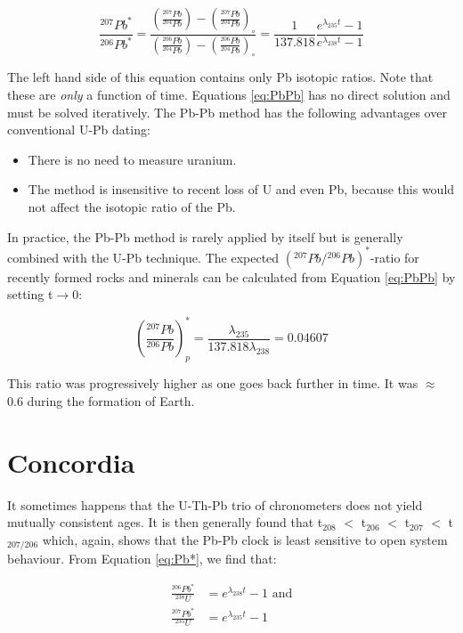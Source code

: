 \begin{equation}
\frac{^{207}Pb^*}{^{206}Pb^*} = 
\frac{\left(\frac{^{207}Pb}{^{204}Pb}\right)-\left(\frac{^{207}Pb}{^{204}Pb}\right)_\circ}
{\left(\frac{^{206}Pb}{^{204}Pb}\right)-\left(\frac{^{206}Pb}{^{204}Pb}\right)_\circ}
= \frac{1}{137.818} \frac{e^{\lambda_{235}t}-1}{e^{\lambda_{238}t}-1}
\label{eq:PbPb}
\end{equation}

The left hand side of this equation contains only Pb isotopic ratios.
Note that these are \emph{only} a function of time. Equations
\ref{eq:PbPb} has no direct solution and must be solved
iteratively. The Pb-Pb method has the following advantages over
conventional U-Pb dating:

\begin{itemize}
\item There is no need to measure uranium.
\item The method is insensitive to recent loss of U and even Pb,
  because this would not affect the isotopic ratio of the Pb.
\end{itemize}

In practice, the Pb-Pb method is rarely applied by itself but is
generally combined with the U-Pb technique. The expected
$({}^{207}Pb/{}^{206}Pb)^*$-ratio for recently formed rocks and minerals
can be calculated from Equation \ref{eq:PbPb} by setting
t$\rightarrow$0:

\begin{equation}
  \left(\frac{^{207}Pb}{^{206}Pb}\right)^*_p =
  \frac{\lambda_{235}}{137.818\lambda_{238}} = 0.04607
\label{eq:commonPb}
\end{equation}

This ratio was progressively higher as one goes back further in time.
It was $\approx$ 0.6 during the formation of Earth.

\section{Concordia}
\label{sec:intro2concordia}

It sometimes happens that the U-Th-Pb trio of chronometers does not
yield mutually consistent ages. It is then generally found that
t$_{208}$ $<$ t$_{206}$ $<$ t$_{207}$ $<$ t$_{207/206}$ which, again,
shows that the Pb-Pb clock is least sensitive to open system
behaviour.  From Equation \ref{eq:Pb*}, we find that:

\begin{equation}
\begin{array}{rl}
\frac{^{206}Pb^*}{^{238}U} & = e^{\lambda_{238}t}-1 \mbox{~and}\\
\frac{^{207}Pb^*}{^{235}U} & = e^{\lambda_{235}t}-1
\end{array}
\label{eq:wetherill}
\end{equation}

